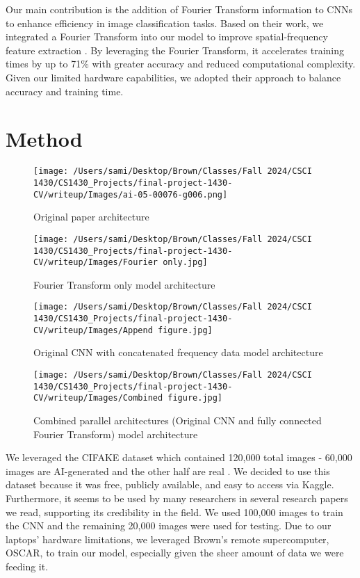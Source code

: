 Our main contribution is the addition of Fourier Transform information to CNNs to enhance efficiency in image classification tasks. Based on their work, we integrated a Fourier Transform into our model to improve spatial-frequency feature extraction \cite{5}. By leveraging the Fourier Transform, it accelerates training times by up to 71\% with greater accuracy and reduced computational complexity. Given our limited hardware capabilities, we adopted their approach to balance accuracy and training time.


\section{Method}

\begin{figure}[htbp]
    \centering
    \begin{minipage}{0.4\textwidth} %
        \centering
        \texttt{[image: /Users/sami/Desktop/Brown/Classes/Fall 2024/CSCI 1430/CS1430\_Projects/final-project-1430-CV/writeup/Images/ai-05-00076-g006.png]}
        \caption{Original paper architecture}\label{fig:fig1}

        \texttt{[image: /Users/sami/Desktop/Brown/Classes/Fall 2024/CSCI 1430/CS1430\_Projects/final-project-1430-CV/writeup/Images/Fourier only.jpg]}
        \caption{Fourier Transform only model architecture}\label{fig:fig2}

        \texttt{[image: /Users/sami/Desktop/Brown/Classes/Fall 2024/CSCI 1430/CS1430\_Projects/final-project-1430-CV/writeup/Images/Append figure.jpg]}
        \caption{Original CNN with concatenated frequency data model architecture}\label{fig:fig3}

        \texttt{[image: /Users/sami/Desktop/Brown/Classes/Fall 2024/CSCI 1430/CS1430\_Projects/final-project-1430-CV/writeup/Images/Combined figure.jpg]}
        \caption{Combined parallel architectures (Original CNN and fully connected Fourier Transform) model architecture}\label{fig:fig4}
        
        
        \label{fig:vertical_boxed_images}
    \end{minipage}%
\end{figure}

We leveraged the CIFAKE dataset which contained 120,000 total images - 60,000 images are AI-generated and the other half are real \cite{1}. We decided to use this dataset because it was free, publicly available, and easy to access via Kaggle. Furthermore, it seems to be used by many researchers in several research papers we read, supporting its credibility in the field. We used 100,000 images to train the CNN and the remaining 20,000 images were used for testing. Due to our laptops’ hardware limitations, we leveraged Brown’s remote supercomputer, OSCAR, to train our model, especially given the sheer amount of data we were feeding it.

